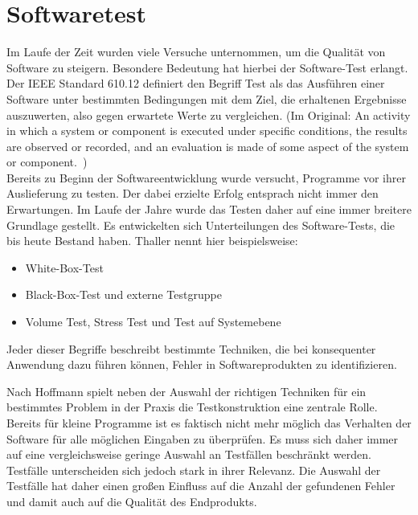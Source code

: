 \section{Softwaretest}
\label{sec:softwaretest}
Im Laufe der Zeit wurden viele Versuche unternommen, um die Qualität von Software zu steigern. Besondere Bedeutung hat hierbei der Software-Test erlangt.
Der IEEE Standard 610.12 definiert den Begriff Test als das Ausführen einer Software unter bestimmten Bedingungen mit dem Ziel, die erhaltenen Ergebnisse auszuwerten, also gegen erwartete Werte zu vergleichen.
(Im Original: \glqq An activity in which a system or component is executed under specific conditions, the results are observed or recorded, and an evaluation is made of some aspect of the system or component.\grqq\ \cite{ieee_ieee_1991})\\
Bereits zu Beginn der Softwareentwicklung wurde versucht, Programme vor ihrer Auslieferung zu testen. Der dabei erzielte Erfolg entsprach nicht immer den Erwartungen. Im Laufe der Jahre wurde das Testen daher auf eine immer breitere Grundlage gestellt. Es entwickelten sich Unterteilungen des Software-Tests, die bis heute Bestand haben. Thaller \cite[vgl. S.18]{thaller_software-test_2002} nennt hier beispielsweise:
\begin{itemize}
\item White-Box-Test
\item Black-Box-Test und externe Testgruppe
\item Volume Test, Stress Test und Test auf Systemebene
\end{itemize}
Jeder dieser Begriffe beschreibt bestimmte Techniken, die bei konsequenter Anwendung dazu führen können, Fehler in Softwareprodukten zu identifizieren. 

Nach Hoffmann \cite[vgl. S.22]{hoffmann_software-qualitat_2013} spielt neben der Auswahl der richtigen Techniken für ein bestimmtes Problem in der Praxis die Testkonstruktion eine zentrale Rolle. Bereits für kleine Programme ist es faktisch nicht mehr möglich das Verhalten der Software für alle möglichen Eingaben zu überprüfen. Es muss sich daher immer auf eine vergleichsweise geringe Auswahl an Testfällen beschränkt werden. Testfälle unterscheiden sich jedoch stark in ihrer Relevanz. Die Auswahl der Testfälle hat daher einen großen Einfluss auf die Anzahl der gefundenen Fehler und damit auch auf die Qualität des Endprodukts. 

